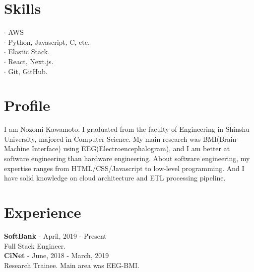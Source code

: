 \documentclass[11pt]{article} %
\begin{document}
\begin{paracol}{2}

\section{\Large Skills}
$\cdot$ AWS\\
$\cdot$ Python, Javascript, C, etc.\\
$\cdot$ Elastic Stack.\\
$\cdot$ React, Next.js.\\
$\cdot$ Git, GitHub.\\

\switchcolumn %


\section{Profile}
I am Nozomi Kawamoto. I graduated from the faculty of Engineering in Shinshu University, majored in Computer Science. 
My main research was BMI(Brain-Machine Interface) using EEG(Electroencephalogram), and I am better at software engineering than hardware engineering.
About software engineering, my expertise ranges from HTML/CSS/Javascript to low-level programming. And I have solid knowledge on cloud architecture and ETL processing pipeline. 

\vspace{1cm}


\section{Experience}
\textbf{\color{subtitle}SoftBank} \hspace{0.5mm} {\color{subtitle} - April, 2019 - Present}\\
Full Stack Engineer. \\

\textbf{\color{subtitle}CiNet} \hspace{0.5mm} {\color{subtitle} - June, 2018 - March, 2019}\\
Research Trainee. Main area was EEG-BMI.\\


\end{paracol}
\end{document}
